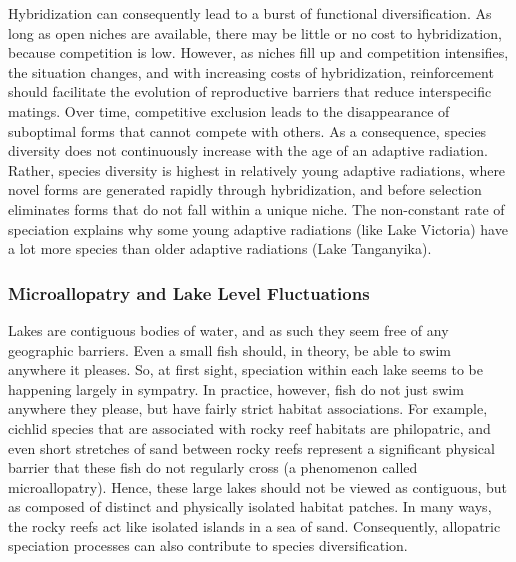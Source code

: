 \documentclass[
]{book}
\begin{document}
Hybridization can consequently lead to a burst of functional diversification. As long as open niches are available, there may be little or no cost to hybridization, because competition is low. However, as niches fill up and competition intensifies, the situation changes, and with increasing costs of hybridization, reinforcement should facilitate the evolution of reproductive barriers that reduce interspecific matings. Over time, competitive exclusion leads to the disappearance of suboptimal forms that cannot compete with others. As a consequence, species diversity does not continuously increase with the age of an adaptive radiation. Rather, species diversity is highest in relatively young adaptive radiations, where novel forms are generated rapidly through hybridization, and before selection eliminates forms that do not fall within a unique niche. The non-constant rate of speciation explains why some young adaptive radiations (like Lake Victoria) have a lot more species than older adaptive radiations (Lake Tanganyika).

\hypertarget{microallopatry-and-lake-level-fluctuations}{%
\subsubsection*{Microallopatry and Lake Level Fluctuations}\label{microallopatry-and-lake-level-fluctuations}}

Lakes are contiguous bodies of water, and as such they seem free of any geographic barriers. Even a small fish should, in theory, be able to swim anywhere it pleases. So, at first sight, speciation within each lake seems to be happening largely in sympatry. In practice, however, fish do not just swim anywhere they please, but have fairly strict habitat associations. For example, cichlid species that are associated with rocky reef habitats are philopatric, and even short stretches of sand between rocky reefs represent a significant physical barrier that these fish do not regularly cross (a phenomenon called microallopatry). Hence, these large lakes should not be viewed as contiguous, but as composed of distinct and physically isolated habitat patches. In many ways, the rocky reefs act like isolated islands in a sea of sand. Consequently, allopatric speciation processes can also contribute to species diversification.
\end{document}
